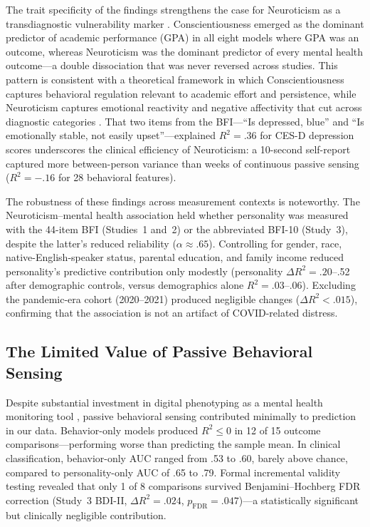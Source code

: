 \documentclass[12pt, a4paper]{article}
\begin{document}
The trait specificity of the findings strengthens the case for Neuroticism as a transdiagnostic vulnerability marker \citep{lahey2009public}. Conscientiousness emerged as the dominant predictor of academic performance (GPA) in all eight models where GPA was an outcome, whereas Neuroticism was the dominant predictor of every mental health outcome---a double dissociation that was never reversed across studies. This pattern is consistent with a theoretical framework in which Conscientiousness captures behavioral regulation relevant to academic effort and persistence, while Neuroticism captures emotional reactivity and negative affectivity that cut across diagnostic categories \citep{widiger2007plate}. That two items from the BFI---``Is depressed, blue'' and ``Is emotionally stable, not easily upset''---explained $R^2 = .36$ for CES-D depression scores underscores the clinical efficiency of Neuroticism: a 10-second self-report captured more between-person variance than weeks of continuous passive sensing ($R^2 = -.16$ for 28 behavioral features).

The robustness of these findings across measurement contexts is noteworthy. The Neuroticism--mental health association held whether personality was measured with the 44-item BFI \citep{john1999big} (Studies~1 and~2) or the abbreviated BFI-10 \citep{rammstedt2007measuring} (Study~3), despite the latter's reduced reliability ($\alpha \approx .65$). Controlling for gender, race, native-English-speaker status, parental education, and family income reduced personality's predictive contribution only modestly (personality $\Delta R^2 = .20$--.52 after demographic controls, versus demographics alone $R^2 = .03$--.06). Excluding the pandemic-era cohort (2020--2021) produced negligible changes ($\Delta R^2 < .015$), confirming that the association is not an artifact of COVID-related distress.

\subsection{The Limited Value of Passive Behavioral Sensing}

Despite substantial investment in digital phenotyping as a mental health monitoring tool \citep{insel2018digital, torous2021growing}, passive behavioral sensing contributed minimally to prediction in our data. Behavior-only models produced $R^2 \leq 0$ in 12 of 15 outcome comparisons---performing worse than predicting the sample mean. In clinical classification, behavior-only AUC ranged from .53 to .60, barely above chance, compared to personality-only AUC of .65 to .79. Formal incremental validity testing revealed that only 1 of 8 comparisons survived Benjamini--Hochberg FDR correction (Study~3 BDI-II, $\Delta R^2 = .024$, $p_{\mathrm{FDR}} = .047$)---a statistically significant but clinically negligible contribution.
\end{document}
